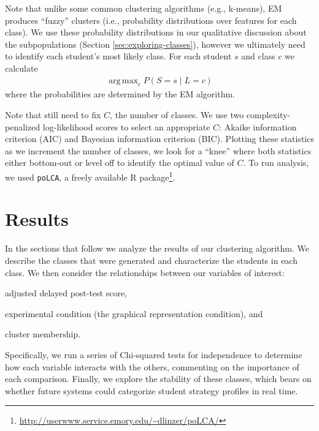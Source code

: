 \documentclass{edm_template}
\DeclareMathOperator*{\argmax}{arg\,max}
\begin{document}
Note that unlike some common clustering algorithms (e.g., k-means), EM produces ``fuzzy'' clusters (i.e., probability distributions over features for each class). We use these probability distributions in our qualitative discussion about the subpopulations (Section \ref{sec:exploring-classes}), however we ultimately need to identify each student's most likely class. For each student $s$ and class $c$ we calculate
\begin{align}
\argmax_{c} P(S = s \;|\; L = c)
\label{eqn:LCA-argmax}
\end{align}
where the probabilities are determined by the EM algorithm.

Note that still need to fix $C$, the number of classes. We use two complexity-penalized log-likelihood scores to select an appropriate $C$: Akaike information criterion (AIC) and Bayesian information criterion (BIC). Plotting these statistics as we increment the number of classes, we look for a ``knee'' where both statistics either bottom-out or level off to identify the optimal value of $C$. To run analysis, we used \texttt{poLCA}, a freely available R package\footnote{\url{http://userwww.service.emory.edu/~dlinzer/poLCA/}}.

\section{Results}
\label{sec:results}

In the sections that follow we analyze the results of our clustering algorithm. We describe the classes that were generated and characterize the students in each class. We then consider the relationships between our variables of interest: 
\begin{inparaenum}[\itshape (a)]
\item adjusted delayed post-test score,
\item experimental condition (the graphical representation condition), and
\item cluster membership.
\end{inparaenum}
Specifically, we run a series of Chi-squared tests for independence to determine how each variable interacts with the others, commenting on the importance of each comparison. Finally, we explore the stability of these classes, which bears on whether future systems could categorize student strategy profiles in real time.
\end{document}
